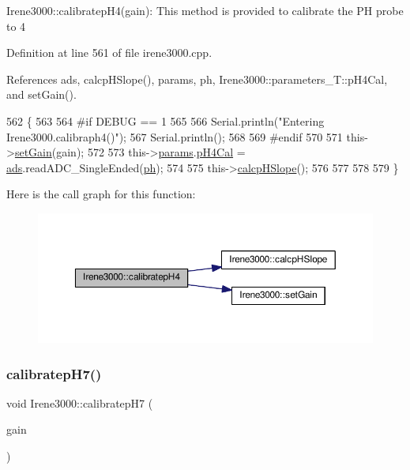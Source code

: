 Irene3000\+::calibratep\+H4(gain)\+: This method is provided to calibrate the PH probe to 4 

Definition at line 561 of file irene3000.\+cpp.



References ads, calcp\+H\+Slope(), params, ph, Irene3000\+::parameters\+\_\+\+T\+::p\+H4\+Cal, and set\+Gain().


\begin{DoxyCode}
562 \{
563 
564 \textcolor{preprocessor}{#if DEBUG == 1 }
565 
566     Serial.println(\textcolor{stringliteral}{"Entering Irene3000.calibraph4()"});
567     Serial.println();
568 
569 \textcolor{preprocessor}{#endif }
570     
571     this->\hyperlink{classIrene3000_aff7c5da186b388e7272e63ff88a20c34}{setGain}(gain);
572 
573     this->\hyperlink{classIrene3000_a136585a5ee7f9ac6ab52175fa153f8e3}{params}.\hyperlink{structIrene3000_1_1parameters__T_a1144de6fb54eb3e1dd2a3d8c2afc97dc}{pH4Cal} =  \hyperlink{classIrene3000_a1215e77ba761c9908d80d691f149e135}{ads}.readADC\_SingleEnded(\hyperlink{Irene3000_8h_af771ceafe0e6524dd8497d4305dfe778}{ph});
574 
575     this->\hyperlink{classIrene3000_a81f6a79e546679692053f7ac1af49613}{calcpHSlope}();
576 
577 
578 
579 \}
\end{DoxyCode}
Here is the call graph for this function\+:\nopagebreak
\begin{figure}[H]
\begin{center}
\leavevmode
\includegraphics[width=350pt]{classIrene3000_a9772eeea2305fad6236a82e33e93892e_cgraph}
\end{center}
\end{figure}
\mbox{\label{classIrene3000_a2e810ddfa8b95eaa2446a408761c6bdc}} 
\subsubsection{\texorpdfstring{calibratep\+H7()}{calibratepH7()}}
{\footnotesize\ttfamily void Irene3000\+::calibratep\+H7 (\begin{DoxyParamCaption}\item[{ads\+Gain\+\_\+t}]{gain }\end{DoxyParamCaption})}

